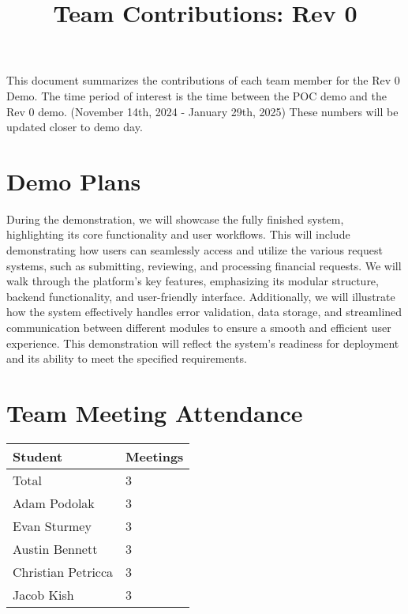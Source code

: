 \documentclass{article}
\title{Team Contributions: Rev 0\\\progname}
\author{\authname}
\date{}
\begin{document}
\maketitle

This document summarizes the contributions of each team member for the Rev 0
Demo.  The time period of interest is the time between the POC demo and the Rev
0 demo. (November 14th, 2024 - January 29th, 2025) These numbers will be updated closer to demo day.

\section{Demo Plans}

During the demonstration, we will showcase the fully finished system, highlighting its core functionality and user workflows. This will include demonstrating how users can seamlessly access and utilize the various request systems, such as submitting, reviewing, and processing financial requests. We will walk through the platform's key features, emphasizing its modular structure, backend functionality, and user-friendly interface. Additionally, we will illustrate how the system effectively handles error validation, data storage, and streamlined communication between different modules to ensure a smooth and efficient user experience. This demonstration will reflect the system’s readiness for deployment and its ability to meet the specified requirements.\\ 


\section{Team Meeting Attendance}


\begin{table}[H]
\centering
\begin{tabular}{ll}
\toprule
\textbf{Student} & \textbf{Meetings}\\
\midrule
Total & 3\\
Adam Podolak & 3\\
Evan Sturmey & 3\\
Austin Bennett & 3\\
Christian Petricca & 3\\
Jacob Kish & 3\\
\bottomrule
\end{tabular}
\end{table}
\end{document}
